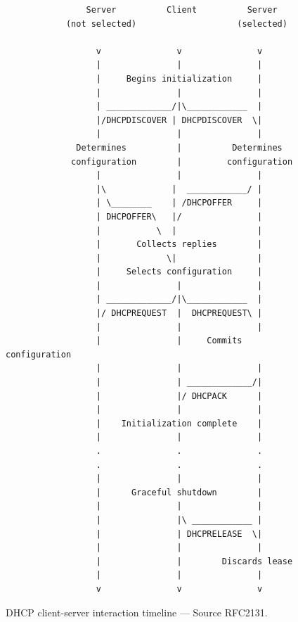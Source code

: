 \documentclass[pdftex,12pt,a4paper]{article}
\begin{document}
            \begin{figure}[!htb]
                \centering
            \begin{verbatim}
                Server          Client          Server
            (not selected)                    (selected)

                  v               v               v
                  |               |               |
                  |     Begins initialization     |
                  |               |               |
                  | _____________/|\____________  |
                  |/DHCPDISCOVER | DHCPDISCOVER  \|
                  |               |               |
              Determines          |          Determines
             configuration        |         configuration
                  |               |               |
                  |\             |  ____________/ |
                  | \________    | /DHCPOFFER     |
                  | DHCPOFFER\   |/               |
                  |           \  |                |
                  |       Collects replies        |
                  |             \|                |
                  |     Selects configuration     |
                  |               |               |
                  | _____________/|\____________  |
                  |/ DHCPREQUEST  |  DHCPREQUEST\ |
                  |               |               |
                  |               |     Commits configuration
                  |               |               |
                  |               | _____________/|
                  |               |/ DHCPACK      |
                  |               |               |
                  |    Initialization complete    |
                  |               |               |
                  .               .               .
                  .               .               .
                  |               |               |
                  |      Graceful shutdown        |
                  |               |               |
                  |               |\ ____________ |
                  |               | DHCPRELEASE  \|
                  |               |               |
                  |               |        Discards lease
                  |               |               |
                  v               v               v\end{verbatim}
                \caption{DHCP client-server interaction timeline --- Source RFC2131.}
                \label{fig:dhcpinteraction}
            \end{figure}
\end{document}
